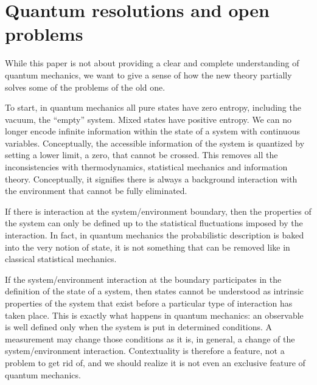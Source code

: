 \documentclass[10pt,twocolumn, nofootinbib]{revtex4-2}
\begin{document}
\section{Quantum resolutions and open problems}

While this paper is not about providing a clear and complete understanding of quantum mechanics, we want to give a sense of how the new theory partially solves some of the problems of the old one.

To start, in quantum mechanics all pure states have zero entropy, including the vacuum, the ``empty'' system. Mixed states have positive entropy. We can no longer encode infinite information within the state of a system with continuous variables. Conceptually, the accessible information of the system is quantized by setting a lower limit, a zero, that cannot be crossed. This removes all the inconsistencies with thermodynamics, statistical mechanics and information theory. Conceptually, it signifies there is always a background interaction with the environment that cannot be fully eliminated.

If there is interaction at the system/environment boundary, then the properties of the system can only be defined up to the statistical fluctuations imposed by the interaction. In fact, in quantum mechanics the probabilistic description is baked into the very notion of state, it is not something that can be removed like in classical statistical mechanics.

If the system/environment interaction at the boundary participates in the definition of the state of a system, then states cannot be understood as intrinsic properties of the system that exist before a particular type of interaction has taken place. This is exactly what happens in quantum mechanics: an observable is well defined only when the system is put in determined conditions. A measurement may change those conditions as it is, in general, a change of the system/environment interaction. Contextuality is therefore a feature, not a problem to get rid of, and we should realize it is not even an exclusive feature of quantum mechanics.
\end{document}
